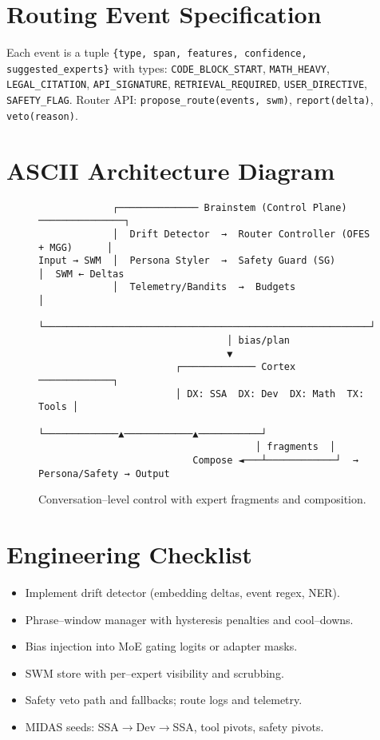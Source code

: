 \documentclass[11pt]{article}
\newcommand{\SWM}{\textsc{SWM}}
\begin{document}
\section{Routing Event Specification}
Each event is a tuple \texttt{\{type, span, features, confidence, suggested\_experts\}} with types:
\texttt{CODE\_BLOCK\_START}, \texttt{MATH\_HEAVY}, \texttt{LEGAL\_CITATION}, \texttt{API\_SIGNATURE}, \texttt{RETRIEVAL\_REQUIRED}, \texttt{USER\_DIRECTIVE}, \texttt{SAFETY\_FLAG}.
Router API: \texttt{propose\_route(events, swm)}, \texttt{report(delta)}, \texttt{veto(reason)}.

\section{ASCII Architecture Diagram}
\begin{figure}[h]
\centering
\begin{minipage}{0.95\linewidth}
\small
\begin{verbatim}
             ┌────────────── Brainstem (Control Plane) ───────────────┐
             │  Drift Detector  →  Router Controller (OFES + MGG)      │
Input → SWM  │  Persona Styler  →  Safety Guard (SG)                   │  SWM ← Deltas
             │  Telemetry/Bandits  →  Budgets                          │
             └─────────────────────────────────────────────────────────┘
                                 │ bias/plan
                                 ▼
                        ┌───────────── Cortex ─────────────┐
                        │ DX: SSA  DX: Dev  DX: Math  TX: Tools │
                        └─────────────▲────────────▲───────────┘
                                      │ fragments  │
                           Compose ◄───┴────────────┘  → Persona/Safety → Output
\end{verbatim}
\end{minipage}
\caption{Conversation--level control with expert fragments and composition.}
\end{figure}

\section{Engineering Checklist}
\begin{itemize}[leftmargin=*,itemsep=2pt,topsep=2pt]
\item Implement drift detector (embedding deltas, event regex, NER).
\item Phrase--window manager with hysteresis penalties and cool--downs.
\item Bias injection into MoE gating logits or adapter masks.
\item \SWM{} store with per--expert visibility and scrubbing.
\item Safety veto path and fallbacks; route logs and telemetry.
\item MIDAS seeds: SSA$\to$Dev$\to$SSA, tool pivots, safety pivots.
\end{itemize}
\end{document}
